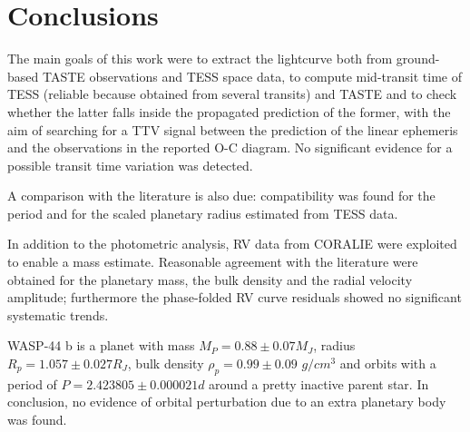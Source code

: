 \documentclass{aa}
\begin{document}



\section{Conclusions}


The main goals of this work were to extract the lightcurve both from ground-based TASTE observations and TESS space data, to compute mid-transit time of TESS (reliable because obtained from several transits) and TASTE and to check whether the latter falls inside the propagated prediction of the former, with the aim of searching for a TTV signal between the prediction of the linear ephemeris and the observations in the reported O-C diagram.  
No significant evidence for a possible transit time variation was detected.

A comparison with the literature is also due: compatibility was found for the period and for the scaled planetary radius estimated from TESS data.

In addition to the photometric analysis, RV data from CORALIE were exploited to enable a mass estimate. Reasonable agreement with the literature were obtained for the planetary mass, the bulk density and the radial velocity amplitude; furthermore the phase-folded RV curve residuals showed no significant systematic trends. 

WASP-44 b is a planet with mass $M_P=0.88\pm0.07 M_J$, 
radius $R_p=1.057\pm0.027 R_{J}$,
bulk density $\rho_p =0.99\pm0.09$ $g/cm^3$ and orbits with a period of $P=2.423805\pm0.000021d$ around a pretty inactive parent star. 
In conclusion, no evidence of orbital perturbation due to an extra planetary body was 
found.
\end{document}
